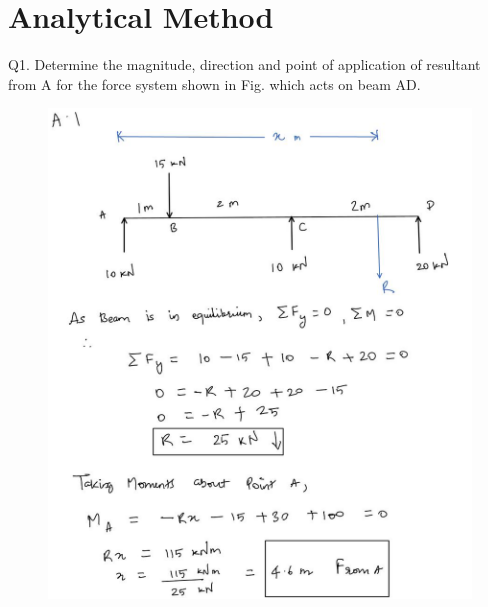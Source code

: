 \documentclass[11pt]{article}
\begin{document}
\pagebreak
\section{Analytical Method}


Q1. Determine the magnitude, direction and point of application of resultant from A for the force system shown in Fig. which acts on beam AD.
\begin{figure}[H]
	\includegraphics[scale=0.5]{a1.jpg}
	\label{fig: Polygon Law}
\end{figure}
\end{document}
